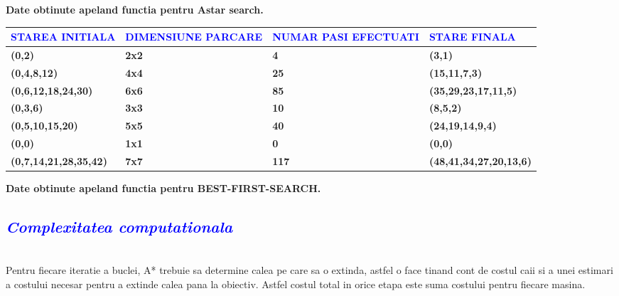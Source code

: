 \documentclass{article}
\begin{document}
\begin{flushleft}
\begin{flushleft}
\begin{center}
   \quad \textbf{Date obtinute apeland functia pentru Astar search.} \par
\end{center} 
\vspace{5mm}
\begin{center}
\begin{tabularx}{1\textwidth} { 
  | >{\raggedright\arraybackslash}X 
  | >{\centering\arraybackslash}X 
  | >{\centering\arraybackslash}X 
  | >{\raggedleft\arraybackslash}X  |}
\hline
\textcolor{blue}{\bfseries STAREA INITIALA } & \textcolor{blue}{\bfseries DIMENSIUNE PARCARE} & \textcolor{blue}{\bfseries NUMAR PASI EFECTUATI} & \textcolor{blue}{\bfseries STARE FINALA }\\
\hline
 \bfseries (0,2)  & \bfseries 2x2 & \bfseries 4  & \bfseries (3,1)  \\
\hline
 \bfseries (0,4,8,12) & \bfseries 4x4 & \bfseries 25 & \bfseries (15,11,7,3)\\
\hline
 \bfseries (0,6,12,18,24,30) & \bfseries 6x6 & \bfseries 85 & \bfseries (35,29,23,17,11,5)\\
\hline
 \bfseries (0,3,6) & \bfseries 3x3 & \bfseries 10 & \bfseries (8,5,2)\\
\hline
 \bfseries (0,5,10,15,20) & \bfseries 5x5 & \bfseries 40 & \bfseries (24,19,14,9,4)\\
\hline
 \bfseries (0,0) & \bfseries 1x1 & \bfseries 0 & \bfseries (0,0)\\
\hline
\bfseries (0,7,14,21,28,35,42) & \bfseries 7x7 & \bfseries 117 & \bfseries (48,41,34,27,20,13,6)\\
\hline 
\end{tabularx}
\vspace{2mm}
   \quad \textbf{Date obtinute apeland functia pentru BEST-FIRST-SEARCH.} \par
   \vspace{10mm}
\end{center} 
\end{flushleft}
\textcolor{blue}{\subsection{\itshape\textcolor{blue}{Complexitatea computationala}}}
\quad\\ Pentru fiecare iteratie a buclei, A* trebuie sa determine calea pe care sa o extinda, astfel o face tinand cont de costul caii si a unei estimari a costului necesar pentru a extinde calea pana la obiectiv. Astfel costul total in orice etapa este suma costului pentru fiecare masina.\\ \par


\end{flushleft}
\end{document}
